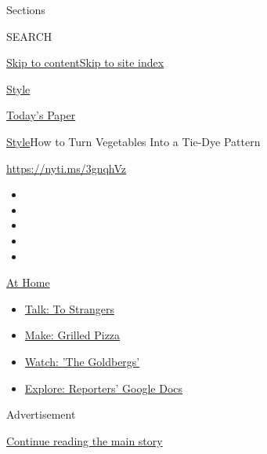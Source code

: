 Sections

SEARCH

\protect\hyperlink{site-content}{Skip to
content}\protect\hyperlink{site-index}{Skip to site index}

\href{https://www.nytimes.com/section/style}{Style}

\href{https://myaccount.nytimes.com/auth/login?response_type=cookie\&client_id=vi}{}

\href{https://www.nytimes.com/section/todayspaper}{Today's Paper}

\href{/section/style}{Style}\textbar{}How to Turn Vegetables Into a
Tie-Dye Pattern

\url{https://nyti.ms/3gnqhVz}

\begin{itemize}
\item
\item
\item
\item
\item
\end{itemize}

\href{https://www.nytimes.com/spotlight/at-home?action=click\&pgtype=Article\&state=default\&region=TOP_BANNER\&context=at_home_menu}{At
Home}

\begin{itemize}
\tightlist
\item
  \href{https://www.nytimes.com/2020/08/03/well/family/the-benefits-of-talking-to-strangers.html?action=click\&pgtype=Article\&state=default\&region=TOP_BANNER\&context=at_home_menu}{Talk:
  To Strangers}
\item
  \href{https://www.nytimes.com/2020/08/01/at-home/coronavirus-make-pizza-on-a-grill.html?action=click\&pgtype=Article\&state=default\&region=TOP_BANNER\&context=at_home_menu}{Make:
  Grilled Pizza}
\item
  \href{https://www.nytimes.com/2020/07/31/arts/television/goldbergs-abc-stream.html?action=click\&pgtype=Article\&state=default\&region=TOP_BANNER\&context=at_home_menu}{Watch:
  'The Goldbergs'}
\item
  \href{https://www.nytimes.com/interactive/2020/at-home/even-more-reporters-editors-diaries-lists-recommendations.html?action=click\&pgtype=Article\&state=default\&region=TOP_BANNER\&context=at_home_menu}{Explore:
  Reporters' Google Docs}
\end{itemize}

Advertisement

\protect\hyperlink{after-top}{Continue reading the main story}

